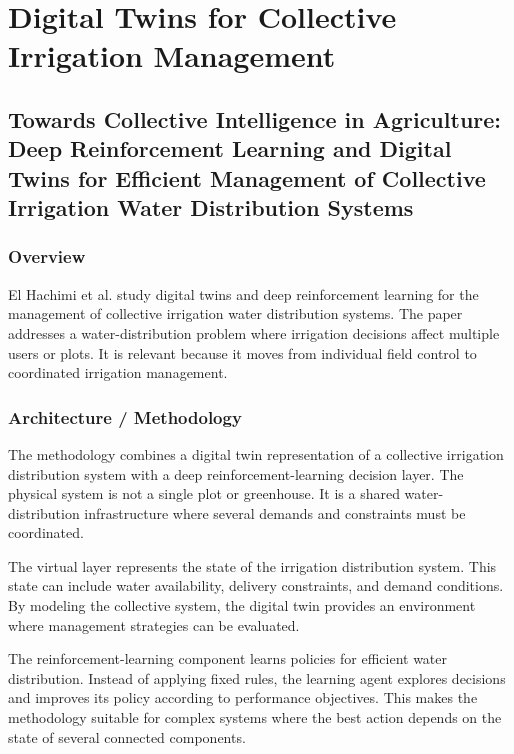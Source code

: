 \section{Digital Twins for Collective Irrigation Management}

\subsection[Towards Collective Intelligence in Agriculture: Deep Reinforcement Learning and Digital Twins for Efficient Management of Collective Irrigation Water Distribution Systems]{Towards Collective Intelligence in Agriculture: Deep Reinforcement Learning and Digital Twins for Efficient Management of Collective Irrigation Water Distribution Systems \cite{elhachimi2025collectiveirrigation}}

\subsubsection{Overview}

El Hachimi et al. study digital twins and deep reinforcement learning for the management of collective irrigation water distribution systems. The paper addresses a water-distribution problem where irrigation decisions affect multiple users or plots. It is relevant because it moves from individual field control to coordinated irrigation management.

\subsubsection{Architecture / Methodology}

The methodology combines a digital twin representation of a collective irrigation distribution system with a deep reinforcement-learning decision layer. The physical system is not a single plot or greenhouse. It is a shared water-distribution infrastructure where several demands and constraints must be coordinated.

The virtual layer represents the state of the irrigation distribution system. This state can include water availability, delivery constraints, and demand conditions. By modeling the collective system, the digital twin provides an environment where management strategies can be evaluated.

The reinforcement-learning component learns policies for efficient water distribution. Instead of applying fixed rules, the learning agent explores decisions and improves its policy according to performance objectives. This makes the methodology suitable for complex systems where the best action depends on the state of several connected components.

